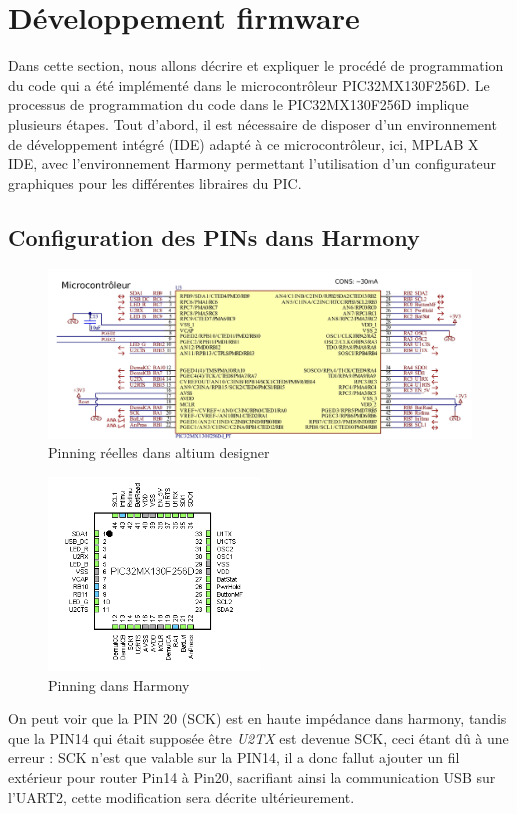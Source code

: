 \section{Développement firmware}
Dans cette section, nous allons décrire et expliquer le procédé de programmation du code qui a été implémenté dans le microcontrôleur PIC32MX130F256D.
Le processus de programmation du code dans le PIC32MX130F256D implique plusieurs étapes. Tout d'abord, il est nécessaire de disposer d'un environnement de développement intégré (IDE) adapté à ce microcontrôleur, ici, MPLAB X IDE, avec l'environnement Harmony permettant l'utilisation d'un configurateur graphiques pour les différentes libraires du PIC.

\subsection{Configuration des PINs dans Harmony}
{
	\begin{figure}[h]
		\centering
		\includegraphics[width=.9\textwidth]{Figures/Dev-SOFT/MCU-Altium}
		\caption{Pinning réelles dans altium designer}
		\label{fig:mcu-altium}
	\end{figure}
	\begin{figure}[h]
		\centering
		\includegraphics[width=0.5\textwidth]{Figures/Dev-SOFT/MCU-Harmony}
		\caption{Pinning dans Harmony}
		\label{fig:mcu-harmony}
	\end{figure}
	
	On peut voir que la PIN 20 (SCK) est en haute impédance dans harmony, tandis que la PIN14 qui était supposée être \textit{U2TX} est devenue SCK, ceci étant dû à une erreur : SCK n'est que valable sur la PIN14, il a donc fallut ajouter un fil extérieur pour router Pin14 à Pin20, sacrifiant ainsi la communication USB sur l'UART2, cette modification sera décrite ultérieurement.
	
	
}

